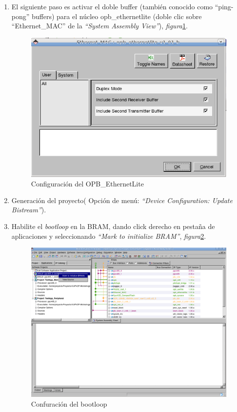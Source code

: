 \begin{enumerate}
  
\item El siguiente paso es activar el doble buffer (también conocido como
``ping-pong'' buffers) para el núcleo opb\_ethernetlite (doble clic sobre
``Ethernet\_MAC'' de la \emph{``System Assembly View''}),
\emph{figura}\ref{Configuración del OPB EthernetLite}.
  \begin{figure}[h!] 
  \centering
  \includegraphics[scale=.25]{./figuras/pingpong.png}
  \caption{Configuración del OPB\_EthernetLite}
  \label{Configuración del OPB EthernetLite}
  \end{figure}
  
  
\item Generación del proyecto( Opción de menú: \emph{``Device Configuration:
Update Bistream''}).
\item Habilite el \emph{bootloop} en la BRAM, dando click derecho en pestaña de
aplicaciones y seleccionando \emph{``Mark to initialize BRAM''},
\emph{figura}\ref{Confuración del bootloop}.
  \begin{figure}[h!] 
  \centering
  \includegraphics[scale=.25]{./figuras/bootloop.png}
  \caption{Confuración del bootloop}
  \label{Confuración del bootloop}
  \end{figure}


\end{enumerate}
